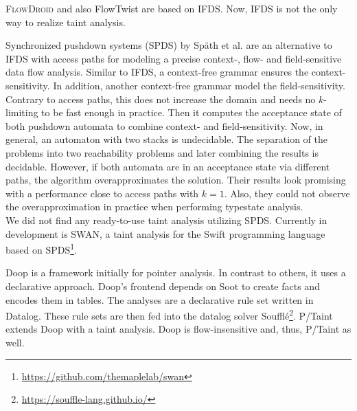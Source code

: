 \documentclass[../draft.tex]{subfiles}
\begin{document}
    \textsc{FlowDroid} and also FlowTwist are based on IFDS. Now, IFDS is not the only way to realize taint analysis.  

    Synchronized pushdown systems (SPDS) by Späth et al.\cite{Spaeth2019} are an alternative to IFDS with access paths for modeling a precise context-, flow- and field-sensitive data flow analysis. 
    Similar to IFDS, a context-free grammar ensures the context-sensitivity. 
    In addition, another context-free grammar model the field-sensitivity.
    Contrary to access paths, this does not increase the domain and needs no $k$-limiting to be fast enough in practice. 
    Then it computes the acceptance state of both pushdown automata to combine context- and field-sensitivity. 
    Now, in general, an automaton with two stacks is undecidable. The separation of the problems into two reachability problems and later combining the results is decidable. However, if both automata are in an acceptance state via different paths, the algorithm overapproximates the solution. 
    Their results look promising with a performance close to access paths with $k=1$.
    Also, they could not observe the overapproximation in practice when performing typestate analysis.\\
    We did not find any ready-to-use taint analysis utilizing SPDS. 
    Currently in development is SWAN, a taint analysis for the Swift programming language based on SPDS\footnote{\url{https://github.com/themaplelab/swan}}.

    Doop \cite{Bravenboer2009} is a framework initially for pointer analysis. In contrast to others, it uses a declarative approach. Doop's frontend depends on Soot to create facts and encodes them in tables. The analyses are a declarative rule set written in Datalog. These rule sets are then fed into the datalog solver Soufflé\footnote{\url{https://souffle-lang.github.io/}}. P/Taint \cite{Grech2017} extends Doop with a taint analysis. Doop is flow-insensitive and, thus, P/Taint as well.
\end{document}
